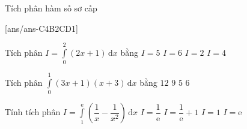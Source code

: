 \begin{dang}{Tích phân hàm số sơ cấp}	
\end{dang}
\TN
{}[ans/ans-C4B2CD1]
\begin{ex}%
	Tích phân $ I=\displaystyle\int\limits_0^2(2x+1)\mathrm{\,d}x$ bằng
	\choice
	{$ I=5$}
	{\True $ I=6$}
	{$ I=2$}
	{$ I=4$}
\end{ex}
%
\begin{ex}%
	Tích phân $\displaystyle\int\limits_0^1\left(3x+1\right)\left(x+3\right)\mathrm{\,d}x$ bằng
	\choice
	{$ 12$}
	{\True $ 9$}
	{$ 5$}
	{$ 6$}
\end{ex}
%
\begin{ex}%
	Tính tích phân $ I=\displaystyle\int\limits_1^\mathrm{e}{\left(\dfrac{1}{x}-\dfrac{1}{x^2}\right)}\mathrm{\,d}x$
	\choice
	{\True $I=\dfrac{1}{\mathrm{e}}$}
	{$I=\dfrac{1}{\mathrm{e}}+1$}
	{$I=1$}
	{$I=\mathrm{e}$}
\end{ex}


